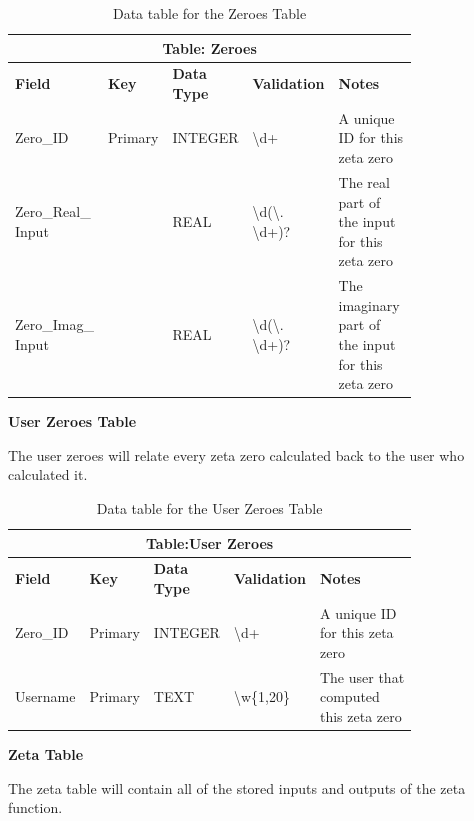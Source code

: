 \documentclass[12pt]{article}
\begin{document}
\begin{table}[ht]
    \centering
    \begin{tabular}{ | p{0.15\linewidth} | p{0.1\linewidth} | p{0.16\linewidth} | p{0.14\linewidth} | p{0.25\linewidth} | }
    \hline
    \multicolumn{5}{|c|}{\textbf{Table: Zeroes}}\\
    \hline
    \hline
    \textbf{Field} & \textbf{Key} & \textbf{Data Type} & \textbf{Validation} & \textbf{Notes} \\
    \hline
    Zero\_ID & Primary & INTEGER & \textbackslash d+ & A unique ID for this zeta zero\\
    \hline
    Zero\_Real\_ Input & & REAL & \textbackslash d(\textbackslash. \textbackslash d+)? & The real part of the input for this zeta zero\\
    \hline
    Zero\_Imag\_ Input & & REAL & \textbackslash d(\textbackslash. \textbackslash d+)? & The imaginary part of the input for this zeta zero\\
    \hline
    \end{tabular}
    \caption{Data table for the Zeroes Table}
\end{table}

\textbf{User Zeroes Table}

The user zeroes will relate every zeta zero calculated back to the user who calculated it.

\begin{table}[ht]
    \centering
    \begin{tabular}{ | p{0.15\linewidth} | p{0.1\linewidth} | p{0.16\linewidth} | p{0.14\linewidth} | p{0.25\linewidth} | }
    \hline
    \multicolumn{5}{|c|}{\textbf{Table:User Zeroes}}\\
    \hline
    \hline
    \textbf{Field} & \textbf{Key} & \textbf{Data Type} & \textbf{Validation} & \textbf{Notes} \\
    \hline
    Zero\_ID & Primary & INTEGER & \textbackslash d+ & A unique ID for this zeta zero\\
    \hline
    Username & Primary & TEXT & \textbackslash w\{1,20\}& The user that computed this zeta zero\\
    \hline
    \end{tabular}
    \caption{Data table for the User Zeroes Table}
\end{table}

\clearpage
\textbf{Zeta Table}

The zeta table will contain all of the stored inputs and outputs of the zeta function.
\end{document}
